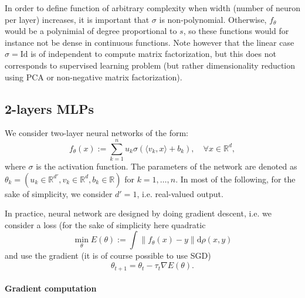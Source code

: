 In order to define function of arbitrary complexity when width (number of neuron per layer) increases, it is important that $\sigma$ is non-polynomial.
Otherwise, $f_\theta$ would be a polynimial of degree proportional to $s$, so these functions would for instance not be dense in continuous functions. 
%
Note however that the linear case $\sigma=\mathrm{Id}$ is of independent to compute matrix factorization, but this does not corresponds to supervised learning problem (but rather dimensionality reduction using PCA or non-negative matrix factorization). 


\subsection{2-layers MLPs}

We consider two-layer neural networks of the form:
\begin{equation}
    f_\theta(x) := \sum_{k=1}^n u_k \sigma(\langle v_k, x \rangle + b_k), \quad \forall x \in \mathbb{R}^d, \label{eq:2layers-nn}
\end{equation}
where $\sigma$ is the activation function. The parameters of the network are denoted as $\theta_k = (u_k \in \mathbb{R}^{d'}, v_k \in \mathbb{R}^d, b_k \in \mathbb{R})$ for $k = 1, \dots, n$. In most of the following, for the sake of simplicity, we consider $d'=1$, i.e. real-valued output. 

In practice, neural network are designed by doing gradient descent, i.e. we consider a loss (for the sake of simplicity here quadratic
\begin{equation}\label{eq:loss-training}
	\min_\theta E(\theta) := \int \|f_\theta(x)-y\| \mathrm{d}\rho(x,y)
\end{equation}
and use the gradient (it is of course possible to use SGD)
$$
	\theta_{t+1} = \theta_t -  \tau_t \nabla E(\theta). 
$$

\paragraph{Gradient computation}

